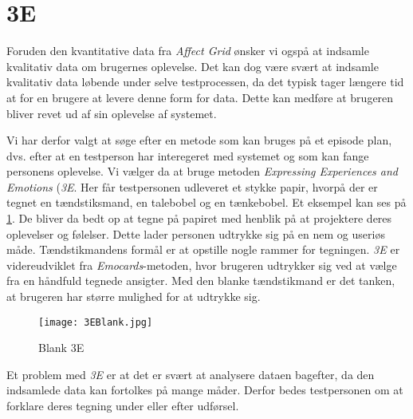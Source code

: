 \section{3E}\label{sec:3E}
Foruden den kvantitative data fra \textit{Affect Grid} ønsker vi ogspå at indsamle kvalitativ data om brugernes oplevelse. Det kan dog være svært at indsamle kvalitativ data løbende under selve testprocessen, da det typisk tager længere tid at for en brugere at levere denne form for data. Dette kan medføre at brugeren bliver revet ud af sin oplevelse af systemet. 

Vi har derfor valgt at søge efter en metode som kan bruges på et episode plan, dvs. efter at en testperson har interegeret med systemet og som kan fange personens oplevelse. Vi vælger da at bruge metoden \textit{Expressing Experiences and Emotions} (\textit{3E}. Her får testpersonen udleveret et stykke papir, hvorpå der er tegnet en tændstiksmand, en talebobel og en tænkebobel. Et eksempel kan ses på \cref{fig:3E}. De bliver da bedt op at tegne på papiret med henblik på at projektere deres oplevelser og følelser. Dette lader personen udtrykke sig på en nem og useriøs måde. Tændstikmandens formål er at opstille nogle rammer for tegningen.  \textit{3E} er videreudviklet fra \textit{Emocards}-metoden, hvor brugeren udtrykker sig ved at vælge fra en håndfuld tegnede ansigter. Med den blanke tændstikmand er det tanken, at brugeren har større mulighed for at udtrykke sig. 


\begin{figure}[h]
\centering
\texttt{[image: 3EBlank.jpg]}
\caption{Blank 3E}
\label{fig:3E}
\end{figure}


Et problem med \textit{3E} er at det er svært at analysere dataen bagefter, da den indsamlede data kan fortolkes på mange måder. Derfor bedes testpersonen om at forklare deres tegning under eller efter udførsel.  